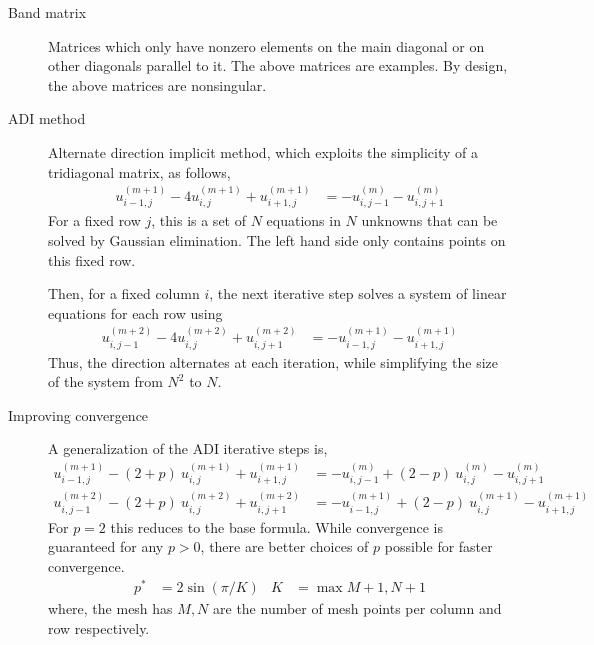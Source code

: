 \begin{description}
    \item[Band matrix] Matrices which only have nonzero elements on the main diagonal
        or on other diagonals parallel to it. The above matrices are examples. By design,
        the above matrices are nonsingular.

    \item[ADI method] Alternate direction implicit method, which exploits the
        simplicity of a tridiagonal matrix, as follows,
        \begin{align}
            u_{i-1,j}^{(m+1)} - 4u_{i,j}^{(m+1)} + u_{i+1,j}^{(m+1)}
             & = -u_{i,j-1}^{(m)} - u_{i,j+1}^{(m)}
        \end{align}
        For a fixed row $ j $, this is a set of $ N $ equations in $ N $ unknowns that
        can be solved by Gaussian elimination. The left hand side only contains points
        on this fixed row. \par
        Then, for a fixed column $ i $, the next iterative step solves a system of
        linear equations for each row using
        \begin{align}
            u_{i,j-1}^{(m+2)} - 4u_{i,j}^{(m+2)} + u_{i,j+1}^{(m+2)}
             & = -u_{i-1,j}^{(m+1)} - u_{i+1,j}^{(m+1)}
        \end{align}
        Thus, the direction alternates at each iteration, while simplifying the size of
        the system from $ N^2 $ to $ N $.

    \item[Improving convergence] A generalization of the ADI iterative steps is,
        \begin{align}
            u_{i-1,j}^{(m+1)} - (2+p)\ u_{i,j}^{(m+1)} + u_{i+1,j}^{(m+1)}
             & = -u_{i,j-1}^{(m)} + (2-p)\ u_{i,j}^{(m)} - u_{i,j+1}^{(m)}       \\
            u_{i,j-1}^{(m+2)} - (2+p)\ u_{i,j}^{(m+2)} + u_{i,j+1}^{(m+2)}
             & = -u_{i-1,j}^{(m+1)} + (2-p)\ u_{i,j}^{(m+1)} - u_{i+1,j}^{(m+1)}
        \end{align}
        For $ p=2 $ this reduces to the base formula. While convergence is guaranteed for
        any $ p > 0 $, there are better choices of $ p $ possible for faster convergence.
        \begin{align}
            p^* & = 2\sin(\pi/K) & K & = \max{M+1, N+1}
        \end{align}
        where, the mesh has $ M,N $ are the number of mesh points per column and row
        respectively.
\end{description}


